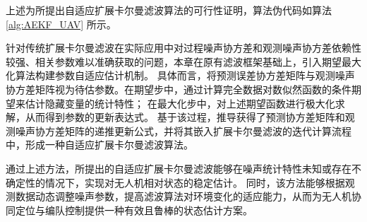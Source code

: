 上述为所提出自适应扩展卡尔曼滤波算法的可行性证明，算法伪代码如算法\ref{alg:AEKF_UAV} 所示。


针对传统扩展卡尔曼滤波在实际应用中对过程噪声协方差和观测噪声协方差依赖性较强、相关参数难以准确获取的问题，本章在原有滤波框架基础上，引入期望最大化算法构建参数自适应估计机制。
具体而言，将预测误差协方差矩阵与观测噪声协方差矩阵视为待估参数。在期望步中，通过计算完全数据对数似然函数的条件期望来估计隐藏变量的统计特性；
在最大化步中，对上述期望函数进行极大化求解，从而得到参数的更新表达式。
基于该过程，推导获得了预测协方差矩阵和观测噪声协方差矩阵的递推更新公式，并将其嵌入扩展卡尔曼滤波的迭代计算流程中，形成一种自适应扩展卡尔曼滤波算法。

通过上述方法，所提出的自适应扩展卡尔曼滤波能够在噪声统计特性未知或存在不确定性的情况下，实现对无人机相对状态的稳定估计。
同时，该方法能够根据观测数据动态调整噪声参数，提高滤波算法对环境变化的适应能力，从而为无人机协同定位与编队控制提供一种有效且鲁棒的状态估计方案。


